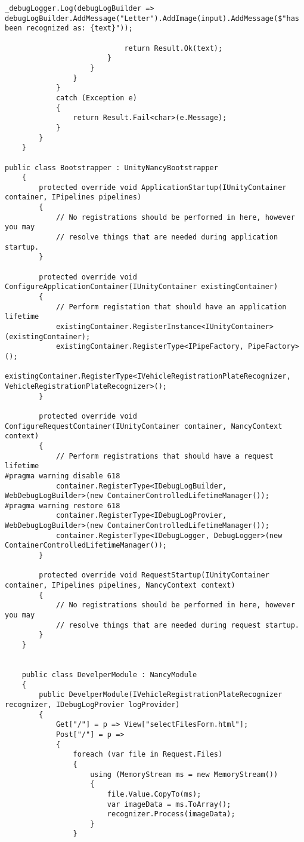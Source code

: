 \begin{lstlisting}[style=fsharpstyle,caption={Исходный код}, label=lst:recognition_result_handler]
                            _debugLogger.Log(debugLogBuilder => debugLogBuilder.AddMessage("Letter").AddImage(input).AddMessage($"has been recognized as: {text}"));

                            return Result.Ok(text);
                        }
                    }
                }
            }
            catch (Exception e)
            {
                return Result.Fail<char>(e.Message);
            }
        }
    }

public class Bootstrapper : UnityNancyBootstrapper
    {
        protected override void ApplicationStartup(IUnityContainer container, IPipelines pipelines)
        {
            // No registrations should be performed in here, however you may
            // resolve things that are needed during application startup.
        }

        protected override void ConfigureApplicationContainer(IUnityContainer existingContainer)
        {
            // Perform registation that should have an application lifetime
            existingContainer.RegisterInstance<IUnityContainer>(existingContainer);
            existingContainer.RegisterType<IPipeFactory, PipeFactory>();
            existingContainer.RegisterType<IVehicleRegistrationPlateRecognizer, VehicleRegistrationPlateRecognizer>();
        }

        protected override void ConfigureRequestContainer(IUnityContainer container, NancyContext context)
        {
            // Perform registrations that should have a request lifetime
#pragma warning disable 618
            container.RegisterType<IDebugLogBuilder, WebDebugLogBuilder>(new ContainerControlledLifetimeManager());
#pragma warning restore 618
            container.RegisterType<IDebugLogProvier, WebDebugLogBuilder>(new ContainerControlledLifetimeManager());
            container.RegisterType<IDebugLogger, DebugLogger>(new ContainerControlledLifetimeManager());
        }

        protected override void RequestStartup(IUnityContainer container, IPipelines pipelines, NancyContext context)
        {
            // No registrations should be performed in here, however you may
            // resolve things that are needed during request startup.
        }
    }


    public class DevelperModule : NancyModule
    {
        public DevelperModule(IVehicleRegistrationPlateRecognizer recognizer, IDebugLogProvier logProvider)
        {
            Get["/"] = p => View["selectFilesForm.html"];
            Post["/"] = p =>
            {
                foreach (var file in Request.Files)
                {
                    using (MemoryStream ms = new MemoryStream())
                    {
                        file.Value.CopyTo(ms);
                        var imageData = ms.ToArray();
                        recognizer.Process(imageData);
                    }
                }


\end{lstlisting}
